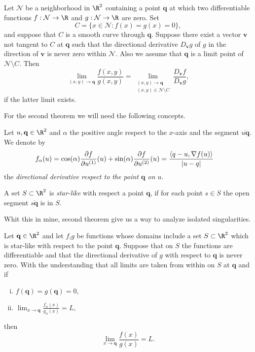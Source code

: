 \begin{thm} \label{thm:Lawlor}
	Let $\mathcal{N}$ be a neighborhood in $\R^2$ containing a point $\mathbf{q}$ at which
	two differentiable functions $f:\mathcal{N}\to \R$ and $g:\mathcal{N}\to \R$ are zero.
	Set 
	$$
		C=\{x \in \mathcal{N}: f(x)=g(x)=0 \},
	$$
	and suppose that $C$ is a smooth curve through $\mathbf{q}$.
	Suppose	there exist a vector $\mathbf{v}$ not tangent to $C$ at $\mathbf{q}$
	such that the directional derivative $D_{\mathbf{v}}g$ of $g$ in the direction of $\mathbf{v}$ is never zero
	within $\mathcal{N}$. Also we assume that $\mathbf{q}$ is a limit point of $\mathcal{N}\setminus C$. Then
	\begin{equation*}
		\lim_{(x,y)\to \mathbf{q}}
		\frac{f(x,y)}{g(x,y)} =
		\lim_{
				\substack{
					(x,y)\to \mathbf{q}\\ 
					(x,y)\in \mathcal{N} \setminus C
				}
		}
		\frac{D_{\mathbf{v}} f }{D_{\mathbf{v}} g},
	\end{equation*}
	if the latter limit exists.
\end{thm}
For the second theorem we will need the following concepts.
\begin{dfn}
	Let $u,\mathbf{q}\in \R^2$ and $\alpha$ the positive angle respect to the $x$-axis and the segment
	$\overline{u \mathbf{q}}$.	We denote by 
	\begin{align*}
		f_{\alpha}(u) &= 
			\cos(\alpha) 		
			\frac{\partial f}{\partial u^{(1)}}(u) + 
			\sin(\alpha)
			\frac{\partial f}{\partial u^{(2)}}(u) 
			= \frac{ \left\langle q-u, \nabla f(u)\right\rangle}{|u-q|}			
	\end{align*}
	the \emph{directional derivative respect to the point $\mathbf{q}$ on $u$}.
\end{dfn}
\begin{dfn}
	A set $S\subset \R^2$ is \emph{star-like} with respect a point $\mathbf{q}$, if for each point $s \in S$ the open 
	segment $\overline{s \mathbf{q}}$ is in $S$.
\end{dfn}
%
Whit this in mine, second theorem give us a way to analyze isolated singularities.
\begin{thm}\label{thm:Fine}
	Let $\mathbf{q}\in \R^2$ and let $f$,$g$ be functions whose domains include a set $S\subset \R^2$ which is 
	star-like 
	with  respect to the point $\mathbf{q}$. Suppose that on $S$ the functions are differentiable and that
	the directional derivative of $g$ with respect to $\mathbf{q}$ is never zero. With the understanding that all 
	limits are taken from within on $S$ at $\mathbf{q}$ and if
	\begin{enumerate}[(i)]
		\item 
			$f(\mathbf{q})=g(\mathbf{q})=0$,
		\item
			$
				\displaystyle
				\lim_{x \to \mathbf{q}}
				\frac{f_{\alpha}(x)}{g_{\alpha}(x)} = L,	
			$
	\end{enumerate}
	then
	$$
		\lim_{x \to \mathbf{q}}
		\frac{f(x)}{g(x)} = L.
	$$
\end{thm}
